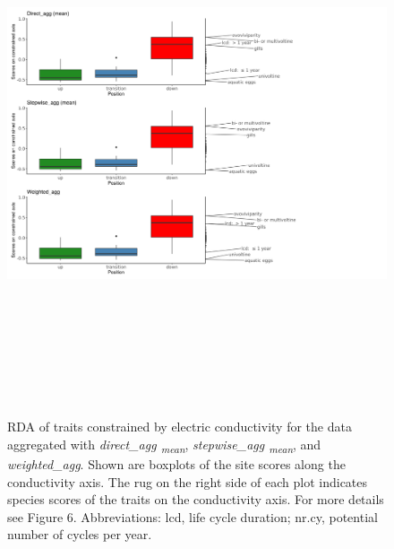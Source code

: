 \documentclass[12pt]{article}
\begin{document}
\begin{figure}[ht]
    \centering
    \includegraphics[width=18.5cm, height=16cm]{boxplot_scores_combined_REMAIN_SI.png}
    \caption{RDA of traits constrained by electric conductivity for the data aggregated with \textit{direct\_agg \textsubscript{mean}}, \textit{stepwise\_agg \textsubscript{mean}}, and \textit{weighted\_agg}. Shown are boxplots of the site scores along the conductivity axis. The rug on the right side of each plot indicates species scores of the traits on the conductivity axis. For more details see Figure 6. %
    Abbreviations: lcd, life cycle duration; nr.cy, potential number of cycles per year.}
    \label{fig:boxplots_scores_on_constrained_axis_REMAIN}
\end{figure}
\end{document}
